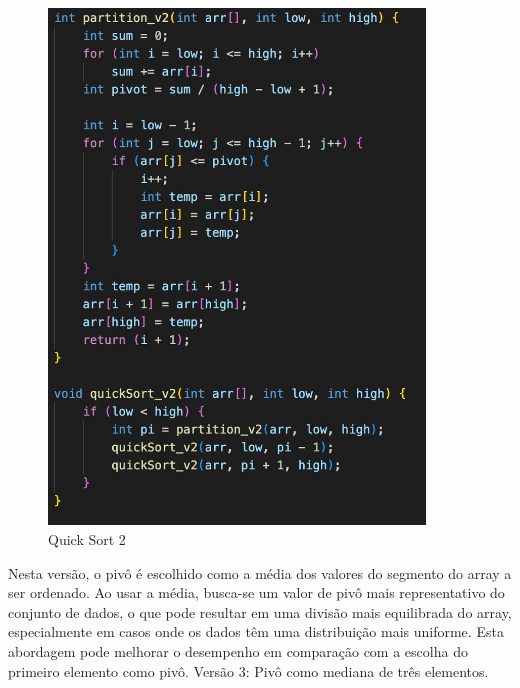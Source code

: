 \begin{figure}[H]
    \centering
    \includegraphics[width = 10cm]{Imagens/Quick Sort/quick2.jpeg}
    \caption{Quick Sort 2}
    \label{grafico_insert}
\end{figure}
Nesta versão, o pivô é escolhido como a média dos valores do segmento do array a ser ordenado. Ao usar a média, busca-se um valor de pivô mais representativo do conjunto de dados, o que pode resultar em uma divisão mais equilibrada do array, especialmente em casos onde os dados têm uma distribuição mais uniforme. Esta abordagem pode melhorar o desempenho em comparação com a escolha do primeiro elemento como pivô.
Versão 3: Pivô como mediana de três elementos.
